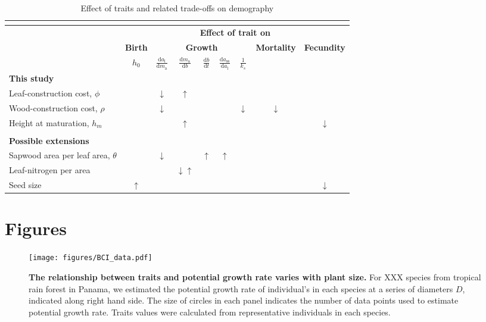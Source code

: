 \documentclass[12pt, a4paper]{article}
\makeatletter
\def\maxwidth{\ifdim\Gin@nat@width>\linewidth\linewidth
\else\Gin@nat@width\fi}
\let\Oldincludegraphics\includegraphics
\renewcommand{\includegraphics}[1]{\Oldincludegraphics[width=\maxwidth]{#1}}
\makeatother
\begin{document}
\begin{table}[ht]
\caption{Effect of traits and related trade-offs on demography}
\centering
{\footnotesize  %
  \begin{doublespace}
  \begin{tabular}[c]{l|c|ccccc|c|c}
  \multicolumn{9}{c}{}\\ \hline
  & \multicolumn{8}{c}{\textbf{Effect of trait on}}\\
  & \textbf{Birth} & \multicolumn{5}{c|}{\textbf{Growth}} & \textbf{Mortality} & \textbf{Fecundity} \\
  & $h_0$
  & $\frac{\textrm{d}a_\textrm{l}}{\textrm{d}m_\textrm{a}}$
  & $\frac{\textrm{d}m_\textrm{a}}{\textrm{d}b}$
  & $\frac{\textrm{d}b}{\textrm{d}t}$
  & $\frac{\textrm{d}a_\textrm{ss}}{\textrm{d}a_\textrm{l}}$
  & $\frac{1}{k_s}$ & &  \\\hline
  \textbf{This study}&&&&&&&&\\
  Leaf-construction cost, $\phi$ & & $\downarrow$ & $\uparrow$ & & & & \\
  Wood-construction cost, $\rho$ & & $\downarrow$ &  & & & $\downarrow$ & $\downarrow$  \\
  Height at maturation, $h_m$ & & &$\uparrow$ & & & & & $\downarrow$  \\
  &&&&&&&&\\\hline
  \textbf{Possible extensions}&&&&&&&&\\
  Sapwood area per leaf area, $\theta$ & & $\downarrow$& & $\uparrow$ & $\uparrow$ & & \\
  Leaf-nitrogen per area & & &$\downarrow$$\uparrow$ & & & & & \\
  Seed size & $\uparrow$ & & & & & & & $\downarrow$ \\ \hline
  \end{tabular}
  \end{doublespace}
}
\label{tab:trade-offs}
\end{table}

\newpage

\section{Figures}\label{figures}

\begin{figure}[ht]
\centering
\texttt{[image: figures/BCI\_data.pdf]}
\caption{\textbf{The relationship between traits and potential growth
rate varies with plant size.} For XXX species from tropical rain forest
in Panama, we estimated the potential growth rate of individual's in
each species at a series of diameters $D$, indicated along right hand
side. The size of circles in each panel indicates the number of data
points used to estimate potential growth rate. Traits values were
calculated from representative individuals in each species.
\label{f-BCI}}
\end{figure}
\end{document}
